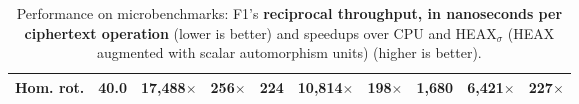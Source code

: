 {\begin{table*}[t]
\begin{scriptsize}
\begin{center}
\begin{tabular}{l|rrr|rrr|rrr}

        Hom. rot.
        &\textbf{40.0} %
        &17,488$\times$ %
        &256$\times$ %

        &\textbf{224} %
        &10,814$\times$ %
        &198$\times$ %

        &\textbf{1,680} %
        &6,421$\times$ %
        &227$\times$ %
        \\

        \bottomrule
      \end{tabular}
      \end{center}
      \caption{Performance on microbenchmarks: F1's \textbf{reciprocal throughput, in nanoseconds per ciphertext operation} (lower is better) and speedups over CPU and HEAX$_\sigma$ (HEAX augmented with scalar automorphism units) (higher is better).}
      \label{tbl:f1microbenchmark}
    \end{scriptsize}
  \end{table*}
}


